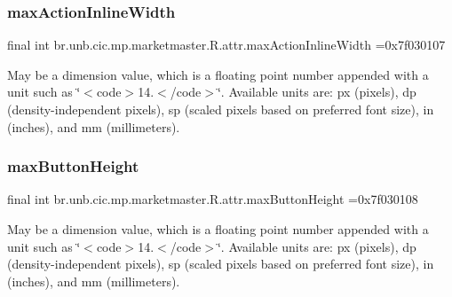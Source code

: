 \subsubsection{\texorpdfstring{max\+Action\+Inline\+Width}{maxActionInlineWidth}}
{\footnotesize\ttfamily final int br.\+unb.\+cic.\+mp.\+marketmaster.\+R.\+attr.\+max\+Action\+Inline\+Width =0x7f030107\hspace{0.3cm}{\ttfamily [static]}}

May be a dimension value, which is a floating point number appended with a unit such as \char`\"{}$<$code$>$14.\+5sp$<$/code$>$\char`\"{}. Available units are\+: px (pixels), dp (density-\/independent pixels), sp (scaled pixels based on preferred font size), in (inches), and mm (millimeters). \mbox{\label{classbr_1_1unb_1_1cic_1_1mp_1_1marketmaster_1_1R_1_1attr_ab8d562f26719352f71bdde8cb1908963}} 
\subsubsection{\texorpdfstring{max\+Button\+Height}{maxButtonHeight}}
{\footnotesize\ttfamily final int br.\+unb.\+cic.\+mp.\+marketmaster.\+R.\+attr.\+max\+Button\+Height =0x7f030108\hspace{0.3cm}{\ttfamily [static]}}

May be a dimension value, which is a floating point number appended with a unit such as \char`\"{}$<$code$>$14.\+5sp$<$/code$>$\char`\"{}. Available units are\+: px (pixels), dp (density-\/independent pixels), sp (scaled pixels based on preferred font size), in (inches), and mm (millimeters). \mbox{\label{classbr_1_1unb_1_1cic_1_1mp_1_1marketmaster_1_1R_1_1attr_a19384c0c052691ffbe6dce04dbe1c36c}} 
